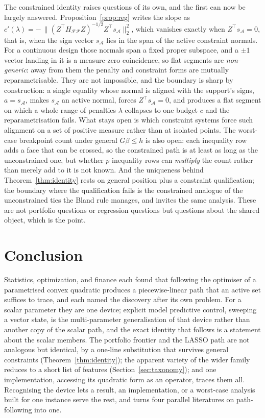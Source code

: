 \documentclass[sts]{imsart}
\newcommand{\F}{\mathcal{F}}
\newcommand{\Aset}{\mathcal{A}}
\newcommand{\trans}{^{\top}}
\theoremstyle{plain}
\theoremstyle{definition}
\begin{document}
The constrained identity raises questions of its own, and the first can now be largely
answered. Proposition~\ref{prop:reg} writes the slope as
$c'(\lambda) = -\,\|(Z\trans H_{\F\F}Z)^{-1/2}Z\trans s_\Aset\|_2^2$, which vanishes
exactly when $Z\trans s_\Aset = 0$, that is, when the sign vector $s_\Aset$ lies in the
span of the active constraint normals. For a continuous design those normals span a
fixed proper subspace, and a $\pm1$ vector landing in it is a measure-zero coincidence,
so flat segments are \emph{non-generic}: away from them the penalty and constraint forms
are mutually reparametrisable. They are not impossible, and the boundary is sharp by
construction: a single equality whose normal is aligned with the support's signs,
$a = s_\Aset$, makes $s_\Aset$ an active normal, forces $Z\trans s_\Aset = 0$, and
produces a flat segment on which a whole range of penalties $\lambda$ collapses to one
budget $c$ and the reparametrisation fails. What stays open is which constraint systems
force such alignment on a set of positive measure rather than at isolated points. The worst-case breakpoint count under general
$G\beta\le h$ is also open: each inequality row adds a face that can be crossed, so the
constrained path is at least as long as the unconstrained one, but whether $p$
inequality rows can \emph{multiply} the count rather than merely add to it is not known.
And the uniqueness behind Theorem~\ref{thm:identity} rests on general position plus a
constraint qualification; the boundary where the qualification fails is the constrained
analogue of the unconstrained ties the Bland rule manages, and invites the same
analysis. These are not portfolio questions or regression questions but questions about
the shared object, which is the point.

\section{Conclusion}

Statistics, optimization, and finance each found that following the optimiser of a
parametrised convex quadratic produces a piecewise-linear path that an active set
suffices to trace, and each named the discovery after its own problem. For a scalar
parameter they are one device; explicit model predictive control, sweeping a vector
state, is the multi-parameter generalisation of that device rather than another copy
of the scalar path, and the exact identity that follows is a statement about the
scalar members. The portfolio frontier and the LASSO path are not analogous but
identical, by
a one-line substitution that survives general constraints
(Theorem~\ref{thm:identity}); the apparent variety of the wider family reduces to a
short list of features (Section~\ref{sec:taxonomy}); and one implementation, accessing
its quadratic form as an operator, traces them all. Recognising the device lets a
result, an implementation, or a worst-case analysis built for one instance serve the
rest, and turns four parallel literatures on path-following into one.
\end{document}
